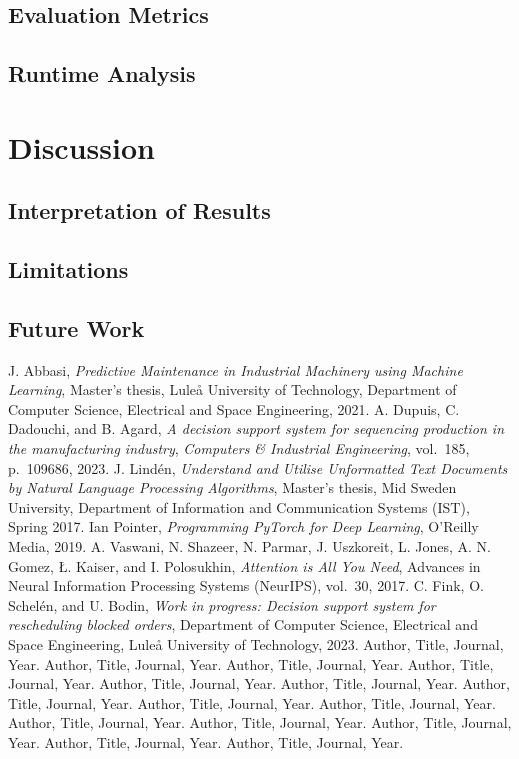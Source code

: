\documentclass[12pt,a4paper]{report}
\begin{document}
\section{Evaluation Metrics}
\section{Runtime Analysis}

\chapter{Discussion}
\section{Interpretation of Results}
\section{Limitations}
\section{Future Work}


\begin{thebibliography}{99}
J. Abbasi, \textit{Predictive Maintenance in Industrial Machinery using Machine Learning}, 
Master’s thesis, Luleå University of Technology, Department of Computer Science, Electrical and Space Engineering, 2021.
A. Dupuis, C. Dadouchi, and B. Agard, 
        \textit{A decision support system for sequencing production in the manufacturing industry},
\textit{Computers \& Industrial Engineering}, vol.~185, p.~109686, 2023. 
 J. Lindén, 
    \textit{Understand and Utilise Unformatted Text Documents by Natural Language Processing Algorithms}, 
    Master’s thesis, Mid Sweden University, Department of Information and Communication Systems (IST), Spring 2017.
 Ian Pointer,
\textit{Programming PyTorch for Deep Learning},
O'Reilly Media, 2019.
A. Vaswani, N. Shazeer, N. Parmar, J. Uszkoreit, L. Jones, 
A. N. Gomez, Ł. Kaiser, and I. Polosukhin, 
\textit{Attention is All You Need}, Advances in Neural Information Processing Systems (NeurIPS), vol.~30, 2017.
C. Fink, O. Schelén, and U. Bodin, 
\textit{Work in progress: Decision support system for rescheduling blocked orders}, 
Department of Computer Science, Electrical and Space Engineering, Luleå University of Technology, 2023.
 Author, Title, Journal, Year.
 Author, Title, Journal, Year.
 Author, Title, Journal, Year.
 Author, Title, Journal, Year.
 Author, Title, Journal, Year.
 Author, Title, Journal, Year.
 Author, Title, Journal, Year.
 Author, Title, Journal, Year.
 Author, Title, Journal, Year.
 Author, Title, Journal, Year.
 Author, Title, Journal, Year.
 Author, Title, Journal, Year.
 Author, Title, Journal, Year.
 Author, Title, Journal, Year.
\end{thebibliography}
\end{document}
